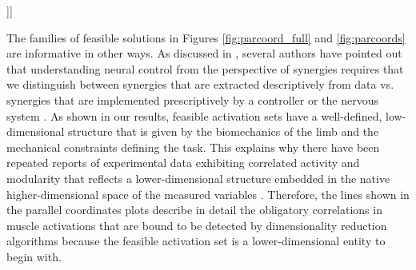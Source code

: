 \documentclass[10pt,letterpaper]{article}
\begin{document}
]]

The families of feasible solutions in Figures \ref{fig:parcoord_full} and \ref{fig:parcoords} are informative in other ways. As discussed  in  \cite{valero-cuevas2015fundamentals}, several authors have pointed out that  understanding neural control from the perspective of synergies requires that we  distinguish between synergies that are extracted descriptively from data vs. synergies that are implemented prescriptively by a controller or the nervous system \cite{alessandro2013musclesynergies,kutch2012challenges,tresch2009case,scholz1999uncontrolled}. As shown in our results, feasible activation sets have a well-defined, low-dimensional structure that is given by the biomechanics of the limb and the mechanical constraints defining the task. This explains why there have been repeated reports of experimental data exhibiting correlated activity and modularity that reflects a lower-dimensional structure embedded in the native higher-dimensional space of the measured variables \cite{Frontiers2012Modularity}. Therefore, the lines shown in the parallel coordinates plots describe in detail the obligatory correlations in muscle activations that are bound to be detected by dimensionality reduction algorithms because the feasible activation set is a lower-dimensional entity to begin with.
\end{document}
